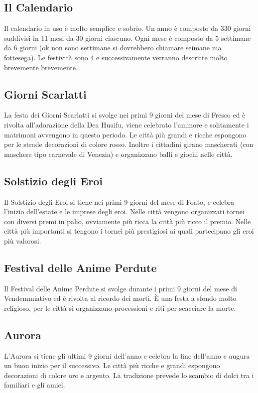 \documentclass[a4paper]{report}
\begin{document}
\begin{multicols}{2}
\section{Il Calendario}
		Il calendario in uso è molto semplice e sobrio. Un anno è composto da 330 giorni suddivisi in 11 mesi da 30 giorni ciascuno. Ogni mese è composto da 5 settimane da 6 giorni (ok non sono settimane si dovrebbero chiamare seimane ma fottesega). Le festività sono 4 e successivamente verranno descritte molto brevemente brevemente.
	\subsection*{Giorni Scarlatti}
		La festa dei Giorni Scarlatti si svolge nei primi 9 giorni del mese di Fresco ed è rivolta all'adorazione della Dea Huaifu, viene celebrato l'ammore e solitamente i matrimoni avvengono in questo periodo. Le città più grandi e ricche espongono per le strade decorazioni di colore rosso. Inoltre i cittadini girano mascherati (con maschere tipo carnevale di Venezia) e organizzano balli e giochi nelle città.
	\subsection*{Solstizio degli Eroi}
		Il Solstizio degli Eroi si tiene nei primi 9 giorni del mese di Foato, e celebra l'inizio dell'estate e le imprese degli eroi. Nelle città vengono organizzati tornei con diversi premi in palio, ovviamente più ricca la città più ricco il premio. Nelle città più importanti si tengono i tornei più prestigiosi ai quali partecipano gli eroi più valorosi.
	\subsection*{Festival delle Anime Perdute}
		Il Festival delle Anime Perdute si svolge durante i primi 9 giorni del mese di Vendemmiativo ed è rivolta al ricordo dei morti. È una festa a sfondo molto religioso, per le città si organizzano processioni e riti per scacciare la morte.
	\subsection*{Aurora}
		L'Aurora si tiene gli ultimi 9 giorni dell'anno e celebra la fine dell'anno e augura un buon inizio per il successivo. Le città più ricche e grandi espongono decorazioni di colore oro e argento. La tradizione prevede lo scambio di dolci tra i familiari e gli amici.
\end{multicols}
\end{document}
